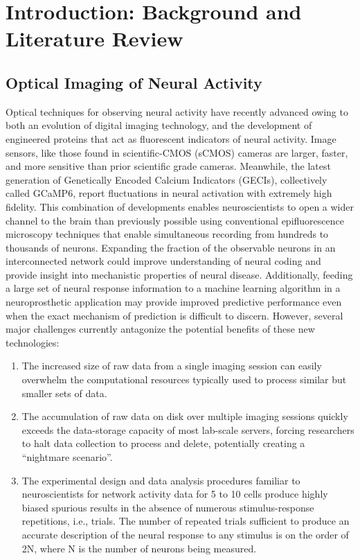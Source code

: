 \documentclass[../main.tex]{subfiles}
\begin{document}
\thispagestyle{myheadings}

\chapter{Introduction: Background and Literature Review}
\label{sec:introduction}


\section{Optical Imaging of Neural Activity}\label{sec:optical-imaging-of-neural-activity}

Optical techniques for observing neural activity have recently advanced owing to both an evolution of digital imaging technology, and the development of engineered proteins that act as fluorescent indicators of neural activity.
Image sensors, like those found in scientific-CMOS (sCMOS) cameras are larger, faster, and more sensitive than prior scientific grade cameras.
Meanwhile, the latest generation of Genetically Encoded Calcium Indicators (GECIs), collectively called GCaMP6, report fluctuations in neural activation with extremely high fidelity.
This combination of developments enables neuroscientists to open a wider channel to the brain than previously possible using conventional epifluorescence microscopy techniques that enable simultaneous recording from hundreds to thousands of neurons.
Expanding the fraction of the observable neurons in an interconnected network could improve understanding of neural coding and provide insight into mechanistic properties of neural disease.
Additionally, feeding a large set of neural response information to a machine learning algorithm in a neuroprosthetic application may provide improved predictive performance even when the exact mechanism of prediction is difficult to discern.
However, several major challenges currently antagonize the potential benefits of these new technologies:

\begin{enumerate}
	\def\labelenumi{\arabic{enumi}.}
	\itemsep1pt\parskip0pt
	\item
	      The increased size of raw data from a single imaging session can
	      easily overwhelm the computational resources typically used to process
	      similar but smaller sets of data.
	\item
	      The accumulation of raw data on disk over multiple imaging sessions
	      quickly exceeds the data-storage capacity of most lab-scale servers,
	      forcing researchers to halt data collection to process and delete,
	      potentially creating a ``nightmare scenario''.
	\item
	      The experimental design and data analysis procedures familiar to
	      neuroscientists for network activity data for 5 to 10 cells produce
	      highly biased spurious results in the absence of numerous
	      stimulus-response repetitions, i.e., trials.
	      The number of repeated trials sufficient to produce an accurate description of the neural response to any stimulus is on the order of 2N, where N is the number of neurons being measured.
\end{enumerate}
\end{document}
